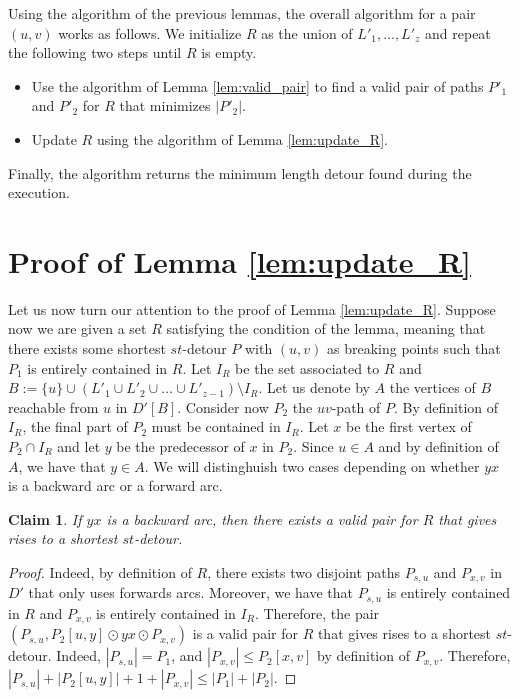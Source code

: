 \documentclass[utf8,11pt]{article}
\theoremstyle{plain}
\newtheorem{claim}{Claim}[theorem]
\theoremstyle{definition}
\begin{document}
Using the algorithm of the previous lemmas, the overall algorithm for a pair $(u,v)$ works as follows. We initialize $R$ as the union of $L'_1, \dots, L'_{z}$ and repeat the following two steps until $R$ is empty.
\begin{itemize}
    \item Use the algorithm of Lemma \ref{lem:valid_pair} to find a valid pair of paths $P'_1$ and $P'_2$ for $R$ that minimizes $|P'_2|$.
    \item Update $R$ using the algorithm of Lemma \ref{lem:update_R}.
\end{itemize}
Finally, the algorithm returns the minimum length detour found during the execution.

\section*{Proof of Lemma \ref{lem:update_R}}
Let us now turn our attention to the proof of Lemma \ref{lem:update_R}. Suppose now we are given a set $R$ satisfying the condition of the lemma, meaning that there exists some shortest $st$-detour $P$ with $(u,v)$ as breaking points such that $P_1$ is entirely contained in $R$. Let $I_R$ be the set associated to $R$ and $B := \{u\} \cup ( L'_1 \cup L'_2 \cup \dots \cup L'_{z-1} )\setminus I_R$. Let us denote by $A$ the vertices of $B$ reachable from $u$ in $D'[B]$. Consider now $P_2$ the $uv$-path of $P$. By definition of $I_R$, the final part of $P_2$ must be contained in $I_R$. Let $x$ be the first vertex of $P_2 \cap I_R$ and let $y$ be the predecessor of $x$ in $P_2$. Since $u \in A$ and by definition of $A$, we have that $y \in A$. We will distinghuish two cases depending on whether $yx$ is a backward arc or a forward arc.

\begin{claim}
If $yx$ is a backward arc, then there exists a valid pair for $R$ that gives rises to a shortest $st$-detour.
\end{claim}

\begin{proof}
    Indeed, by definition of $R$, there exists two disjoint paths $P_{s,u}$ and $P_{x,v}$ in $D'$ that only uses forwards arcs. Moreover, we have that $P_{s,u}$ is entirely contained in $R$ and $P_{x,v}$ is entirely contained in $I_R$. Therefore, the pair $(P_{s,u}, P_2[u,y] \odot yx \odot P_{x,v})$ is a valid pair for $R$ that gives rises to a shortest $st$-detour. Indeed, $|P_{s,u}| = P_1$, and $|P_{x,v}| \leq P_2[x,v]$ by definition of $P_{x,v}$. Therefore, $|P_{s,u}| + |P_2[u,y]| + 1 + |P_{x,v}| \leq |P_1| + |P_2|$.
\end{proof}
\end{document}
